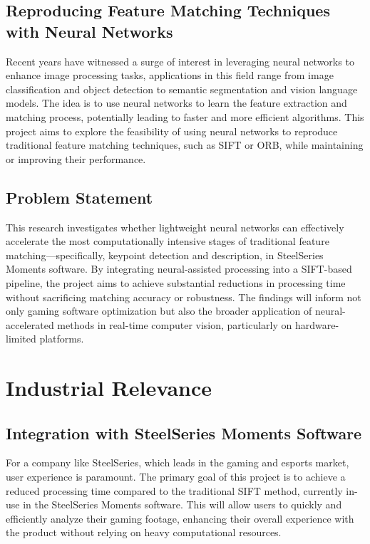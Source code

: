 \subsection{Reproducing Feature Matching Techniques with Neural Networks}
Recent years have witnessed a surge of interest in leveraging neural networks to enhance image processing tasks, applications in this field range from image classification and object detection to semantic segmentation and vision language models. The idea is to use neural networks to learn the feature extraction and matching process, potentially leading to faster and more efficient algorithms. This project aims to explore the feasibility of using neural networks to reproduce traditional feature matching techniques, such as SIFT or ORB, while maintaining or improving their performance.
\subsection{Problem Statement}
This research investigates whether lightweight neural networks can effectively accelerate the most computationally intensive stages of traditional feature matching—specifically, keypoint detection and description, in SteelSeries Moments software. By integrating neural-assisted processing into a SIFT-based pipeline, the project aims to achieve substantial reductions in processing time without sacrificing matching accuracy or robustness. The findings will inform not only gaming software optimization but also the broader application of neural-accelerated methods in real-time computer vision, particularly on hardware-limited platforms.
\section{Industrial Relevance}
\subsection{Integration with SteelSeries Moments Software}
For a company like SteelSeries, which leads in the gaming and esports market, user experience is paramount. The primary goal of this project is to achieve a reduced processing time compared to the traditional SIFT method, currently in-use in the SteelSeries Moments software. This will allow users to quickly and efficiently analyze their gaming footage, enhancing their overall experience with the product without relying on heavy computational resources.
